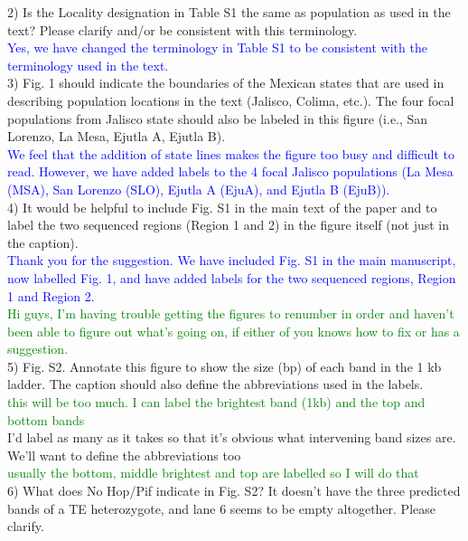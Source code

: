 \documentclass[11pt]{article}
\newcommand{\res}[1]{\noindent \textcolor{blue}{{#1}} \\}
\newcommand{\lev}[1]{\noindent \textcolor{green}{{#1}} \\}
\newcommand{\mbh}[1]{\noindent \textcolor{Dandelion}{{#1}}\\}
\begin{document}
2) Is the Locality designation in Table S1 the same as population as used in the text? Please clarify and/or be consistent with this terminology.\\

\res{Yes, we have changed the terminology in Table S1 to be consistent with the terminology used in the text.}

3) Fig. 1 should indicate the boundaries of the Mexican states that are used in describing population locations in the text (Jalisco, Colima, etc.). The four focal populations from Jalisco state should also be labeled in this figure (i.e., San Lorenzo, La Mesa, Ejutla A, Ejutla B).\\

\res{We feel that the addition of state lines makes the figure too busy and difficult to read. However, we have added labels to the 4 focal Jalisco populations (La Mesa (MSA), San Lorenzo (SLO), Ejutla A (EjuA), and Ejutla B (EjuB)).}

4) It would be helpful to include Fig. S1 in the main text of the paper and to label the two sequenced regions (Region 1 and 2) in the figure itself (not just in the caption). \\

\res{Thank you for the suggestion. We have included Fig. S1 in the main manuscript, now labelled Fig. 1, and have added labels for the two sequenced regions, Region 1 and Region 2.}

\lev{Hi guys, I'm having trouble getting the figures to renumber in order and haven't been able to figure out what's going on, if either of you knows how to fix or has a suggestion.}

5) Fig. S2. Annotate this figure to show the size (bp) of each band in the 1 kb ladder. The caption should also define the abbreviations used in the labels. \\
\lev{this will be too much. I can label the brightest band (1kb) and the top and bottom bands}
\mbh{I'd label as many as it takes so that it's obvious what intervening band sizes are.  We'll want to define the abbreviations too}
\lev{usually the bottom, middle brightest and top are labelled so I will do that}

6) What does No Hop/Pif indicate in Fig. S2? It doesn't have the three predicted bands of a TE heterozygote, and lane 6 seems to be empty altogether. Please clarify. \\
\end{document}
